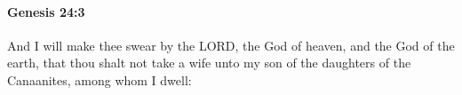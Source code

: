 
		\paragraph{Genesis 24:3} %
			\label{GENESIS-24-3}

			And I will make thee swear by the LORD, the God of heaven, and the God of the earth, that thou shalt not take a wife unto my son of the daughters of the Canaanites, among whom I dwell:


